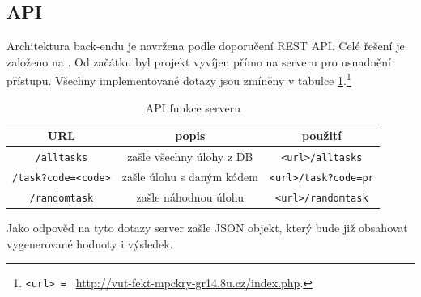 \documentclass[titlepage]{article}
\begin{document}
 \subsection{API}
Architektura back-endu je navržena podle doporučení REST API. Celé řešení je založeno na \cite{restapi}. Od začátku byl projekt vyvíjen přímo na serveru pro usnadnění přístupu. Všechny implementované dotazy jsou zmíněny v tabulce \ref{tab:api}.\footnote{\texttt{<url> = } \url{http://vut-fekt-mpckry-gr14.8u.cz/index.php}.}
\begin{table}[h!]
    \centering
    \caption{API funkce serveru} 
    \label{tab:api}
    \vspace{.5em}
    \begin{tabular}{|c|c|c|}
        \hline
        \textbf{URL} & \textbf{popis} & \textbf{použití} \\
        \hline \hline
        \texttt{/alltasks} & zašle všechny úlohy z DB & \texttt{<url>/alltasks} \\
        \hline
        \texttt{/task?code=<code>} &zašle úlohu s daným kódem & \texttt{<url>/task?code=pr} \\
        \hline
        \texttt{/randomtask} & zašle náhodnou úlohu & \texttt{<url>/randomtask}\\
        \hline
    \end{tabular}
\end{table}

Jako odpověď na tyto dotazy server zašle JSON objekt, který bude již obsahovat vygenerované hodnoty i výsledek. 
\end{document}
